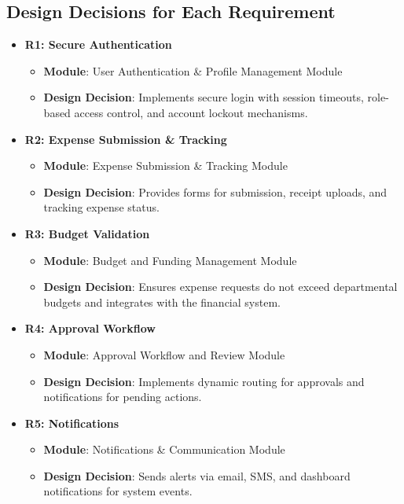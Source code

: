\documentclass[12pt, titlepage]{article}
\begin{document}
\subsection{Design Decisions for Each Requirement}

\begin{itemize}
    \item \textbf{R1: Secure Authentication}
    \begin{itemize}
        \item \textbf{Module}: User Authentication \& Profile Management Module
        \item \textbf{Design Decision}: Implements secure login with session timeouts, role-based access control, and account lockout mechanisms.
    \end{itemize}
    
    \item \textbf{R2: Expense Submission \& Tracking}
    \begin{itemize}
        \item \textbf{Module}: Expense Submission \& Tracking Module
        \item \textbf{Design Decision}: Provides forms for submission, receipt uploads, and tracking expense status.
    \end{itemize}
    
    \item \textbf{R3: Budget Validation}
    \begin{itemize}
        \item \textbf{Module}: Budget and Funding Management Module
        \item \textbf{Design Decision}: Ensures expense requests do not exceed departmental budgets and integrates with the financial system.
    \end{itemize}
    
    \item \textbf{R4: Approval Workflow}
    \begin{itemize}
        \item \textbf{Module}: Approval Workflow and Review Module
        \item \textbf{Design Decision}: Implements dynamic routing for approvals and notifications for pending actions.
    \end{itemize}
    
    \item \textbf{R5: Notifications}
    \begin{itemize}
        \item \textbf{Module}: Notifications \& Communication Module
        \item \textbf{Design Decision}: Sends alerts via email, SMS, and dashboard notifications for system events.
    \end{itemize}
    

\end{itemize}
\end{document}
